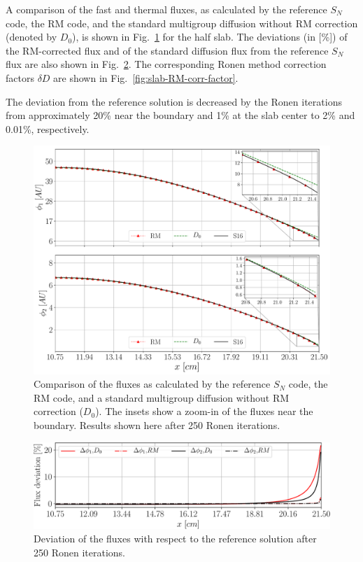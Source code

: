 A comparison of the fast and thermal fluxes, as calculated by the reference $S_N$ code, the RM code, and the standard multigroup diffusion without RM correction (denoted by $D_0$), is shown in Fig.~\ref{fig:slab-fluxes} for the half slab. The deviations (in [\%]) of the RM-corrected flux and of the standard diffusion flux from the reference $S_N$ flux are also shown in Fig.~\ref{fig:slab-fluxes-dev}. The corresponding Ronen method correction factors $\delta D$ are shown in Fig.~\ref{fig:slab-RM-corr-factor}.

The deviation from the reference solution is decreased by the Ronen iterations from approximately 20\% near the boundary and 1\% at the slab center to 2\% and 0.01\%, respectively. 


\begin{figure}[htbp]
	\centering
	\includegraphics[width=0.7\linewidth]{Sn_Diff_Rm_flux_Tomatis2011.pdf}
	\caption{Comparison of the fluxes as calculated by the reference $S_N$ code, the RM code, and a standard multigroup diffusion without RM correction ($D_0$). The insets show a zoom-in of the fluxes near the boundary. Results shown here after 250 Ronen iterations.}
	\label{fig:slab-fluxes}		
\end{figure}

\begin{figure}[htbp]
	\centering
	\includegraphics[width=0.65\linewidth]{flx_err_Tomatis2011_400_250.pdf}
	\caption{Deviation of the fluxes with respect to the reference solution after 250 Ronen iterations.}
	\label{fig:slab-fluxes-dev}
\end{figure}

